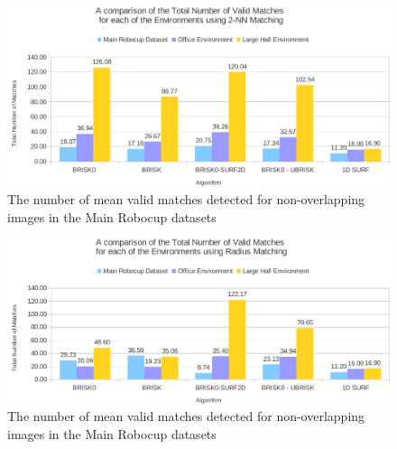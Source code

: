 \documentclass{report}
\begin{document}
\begin{figure}
  \centering
    \includegraphics[width=1.0\textwidth]{../Drawings/Graphs/overall_nvm.pdf}
    \caption{The number of mean valid matches detected for non-overlapping images in the Main Robocup datasets} 
    \label{fig:overall_nvm}
\end{figure}

\begin{figure}
  \centering
    \includegraphics[width=1.0\textwidth]{../Drawings/Graphs/overall_nvm_radius.pdf}
    \caption{The number of mean valid matches detected for non-overlapping images in the Main Robocup datasets} 
    \label{fig:overall_nvm_radius}
\end{figure}
\end{document}
